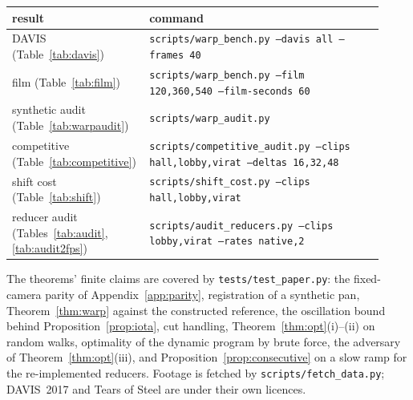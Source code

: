 \begin{center}\scriptsize
\begin{tabular}{p{0.3\linewidth}p{0.62\linewidth}}
\toprule
result & command \\
\midrule
DAVIS (Table~\ref{tab:davis}) & \texttt{scripts/warp\_bench.py --davis all --frames 40} \\
film (Table~\ref{tab:film}) & \texttt{scripts/warp\_bench.py --film 120,360,540 --film-seconds 60} \\
synthetic audit (Table~\ref{tab:warpaudit}) & \texttt{scripts/warp\_audit.py} \\
competitive (Table~\ref{tab:competitive}) & \texttt{scripts/competitive\_audit.py --clips hall,lobby,virat --deltas 16,32,48} \\
shift cost (Table~\ref{tab:shift}) & \texttt{scripts/shift\_cost.py --clips hall,lobby,virat} \\
reducer audit (Tables~\ref{tab:audit}, \ref{tab:audit2fps}) & \texttt{scripts/audit\_reducers.py --clips lobby,virat --rates native,2} \\
\bottomrule
\end{tabular}
\end{center}

The theorems' finite claims are covered by \texttt{tests/test\_paper.py}: the fixed-camera parity of Appendix~\ref{app:parity}, registration of a synthetic pan, Theorem~\ref{thm:warp} against the constructed reference, the oscillation bound behind Proposition~\ref{prop:iota}, cut handling, Theorem~\ref{thm:opt}(i)--(ii) on random walks, optimality of the dynamic program by brute force, the adversary of Theorem~\ref{thm:opt}(iii), and Proposition~\ref{prop:consecutive} on a slow ramp for the re-implemented reducers. Footage is fetched by \texttt{scripts/fetch\_data.py}; DAVIS~2017 and Tears of Steel are under their own licences.
